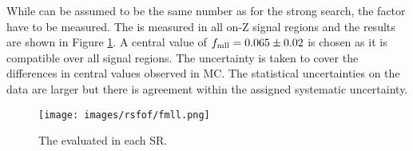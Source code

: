 While \Rsfof can be assumed to be the same number as for the strong search, the factor \fmll have to be measured.
The \fmll is measured in all on-Z signal regions and the results are shown in Figure \ref{fig:fmll}. A central value of $f_{\text{mll}}=0.065\pm0.02$ is chosen as it is compatible over all signal regions.
The uncertainty is taken to cover the differences in central values observed in MC.
The statistical uncertainties on the data are larger but there is agreement within the assigned systematic uncertainty.
\begin{figure}[htbp!]
\begin{center}
    \texttt{[image: images/rsfof/fmll.png]}
    \caption{The \fmll evaluated in each SR.}
\label{fig:fmll}
\end{center}
\end{figure}

